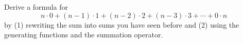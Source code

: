 Derive a formula for 
\[
n \cdot 0 + (n-1) \cdot 1 + (n-2) \cdot 2
+ (n-3) \cdot 3 + \cdots +
0 \cdot n
\]
by (1) rewriting the sum into sums you have seen before and
(2) using the generating functions and the summation operator. 
